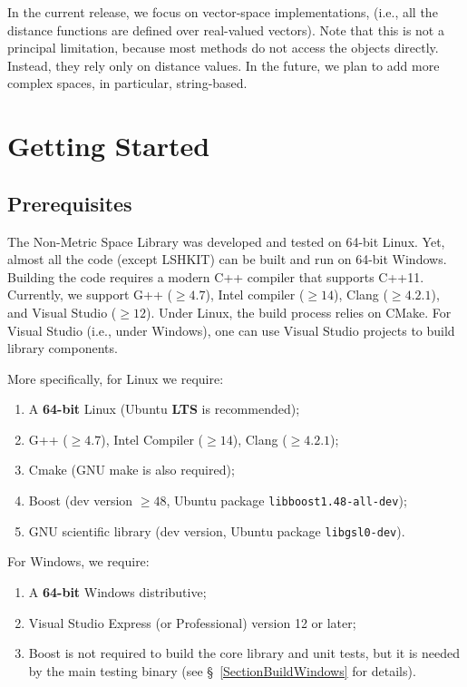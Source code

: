 \documentclass[runningheads,a4paper]{llncs}
\newcommand{\ttt}[1]{\texttt{#1}}
\begin{document}
{In the current release, we focus on vector-space implementations,
(i.e., all the distance functions are defined over real-valued vectors). 
Note that this is not a principal limitation, 
because most methods do not access the objects
directly. 
Instead, they rely only on distance values.
In the future, we plan to add more complex spaces, in particular, string-based.

\section{Getting Started}
\subsection{Prerequisites}
The Non-Metric Space Library was developed and tested on 64-bit Linux.
Yet, almost all the code (except LSHKIT) can be built and run on 64-bit Windows.
Building the code requires a modern C++ compiler that supports \mbox{C++11}.
Currently, we support G++ ($\ge4.7$), Intel compiler ($\ge14$), 
Clang ($\ge4.2.1$), 
and Visual Studio ($\ge12$). 
Under Linux, the build process relies on CMake. 
For Visual Studio (i.e., under Windows),
one can use Visual Studio projects to build library components.


More specifically, for Linux we require:
\begin{enumerate}
\item A \textbf{64-bit} Linux (Ubuntu \textbf{LTS} is recommended);
\item G++ ($\ge4.7$), Intel Compiler ($\ge14$), Clang ($\ge4.2.1$);
\item Cmake (GNU make is also required);
\item Boost (dev version $\ge48$, Ubuntu package \ttt{libboost1.48-all-dev});
\item GNU scientific library (dev version, Ubuntu package \ttt{libgsl0-dev}).
\end{enumerate}

For Windows, we require:
\begin{enumerate}
\item A \textbf{64-bit} Windows distributive; 
\item Visual Studio Express (or Professional) version 12 or later;
\item Boost is not required to build the core library and unit tests, 
but it is needed by the main testing binary (see \S~\ref{SectionBuildWindows} for details). 
\end{enumerate}

}
\end{document}
